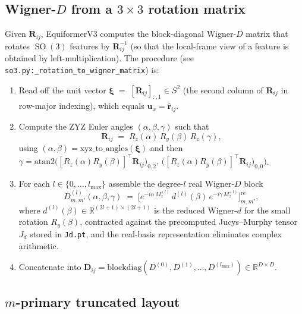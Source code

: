 \documentclass[11pt,a4paper]{article}
\DeclareMathOperator{\SO}{SO}
\newcommand{\R}{\mathbb{R}}
\newcommand{\Sph}{S^2}
\newcommand{\bR}{\bm{R}}
\newcommand{\brh}{\hat{\bm{r}}}
\newcommand{\bu}{\bm{u}}
\newcommand{\bD}{\bm{D}}
\newcommand{\bxi}{\bm{\xi}}
\newcommand{\lmax}{l_{\max}}
\theoremstyle{plain}
\theoremstyle{definition}
\theoremstyle{remark}
\begin{document}
\subsection{Wigner-$D$ from a $3\times 3$ rotation matrix}\label{sec:wignerD}

Given $\bR_{ij}$, EquiformerV3 computes the block-diagonal Wigner-$D$ matrix
that rotates $\SO(3)$ features by $\bR_{ij}^{-1}$ (so that the local-frame view
of a feature is obtained by left-multiplication). The procedure (see
\texttt{so3.py:\_rotation\_to\_wigner\_matrix}) is:
\begin{enumerate}[leftmargin=2em]
    \item Read off the unit vector $\bxi\;=\;[\bR_{ij}]_{:,1}\in\Sph$ (the second column
          of $\bR_{ij}$ in row-major indexing), which equals $\bu_x=\brh_{ij}$.
    \item Compute the ZYZ Euler angles $(\alpha,\beta,\gamma)$ such that
          \begin{equation}\label{eq:zyz-angles}
              \bR_{ij}\;=\;R_z(\alpha)\,R_y(\beta)\,R_z(\gamma),
          \end{equation}
          using $(\alpha,\beta)=\mathrm{xyz\_to\_angles}(\bxi)$ and then $\gamma=\mathrm{atan2}\bigl([R_z(\alpha)R_y(\beta)]^{\top}\bR_{ij}\bigr)_{0,2},\,\bigl([R_z(\alpha)R_y(\beta)]^{\top}\bR_{ij}\bigr)_{0,0}\bigr)$.
    \item For each $l\in\{0,\dots,\lmax\}$ assemble the degree-$l$ real Wigner-$D$ block
          \begin{equation}\label{eq:wignerD-real}
              D^{(l)}_{m,m'}(\alpha,\beta,\gamma)\;=\;\bigl[e^{-i\alpha\,M_z^{(l)}}\,d^{(l)}(\beta)\,e^{-i\gamma\,M_z^{(l)}}\bigr]_{m,m'}^{\mathrm{re}},
          \end{equation}
          where $d^{(l)}(\beta)\in\R^{(2l+1)\times(2l+1)}$ is the reduced Wigner-$d$ for the small rotation $R_y(\beta)$, contracted against the precomputed Jucys--Murphy tensor $J_d$ stored in \texttt{Jd.pt}, and the real-basis representation eliminates complex arithmetic.
    \item Concatenate into
          $\bD_{ij}=\mathrm{blockdiag}(D^{(0)},D^{(1)},\dots,D^{(\lmax)})\in\R^{D\times
                  D}$.
\end{enumerate}

\subsection{$m$-primary truncated layout}\label{sec:mprim}
\end{document}
